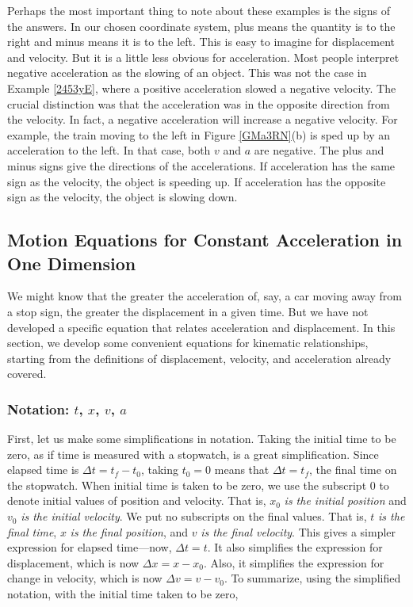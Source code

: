 \documentclass[../../main-ap-physics.tex]{subfiles}
\begin{document}
Perhaps the most important thing to note about these examples is the signs of the answers. In our chosen coordinate system, plus means the quantity is to the right and minus means it is to the left. This is easy to imagine for displacement and velocity. But it is a little less obvious for acceleration. Most people interpret negative acceleration as the slowing of an object. This was not the case in Example \ref{2453yE}, where a positive acceleration slowed a negative velocity. The crucial distinction was that the acceleration was in the opposite direction from the velocity. In fact, a negative acceleration will increase a negative velocity. For example, the train moving to the left in Figure \ref{GMa3RN}(b) is sped up by an acceleration to the left. In that case, both $v$ and $a$ are negative. The plus and minus signs give the directions of the accelerations. If acceleration has the same sign as the velocity, the object is speeding up. If acceleration has the opposite sign as the velocity, the object is slowing down.

\subsection{Motion Equations for Constant Acceleration in One Dimension} \label{WbwyTy}

We might know that the greater the acceleration of, say, a car moving away from a stop sign, the greater the displacement in a given time. But we have not developed a specific equation that relates acceleration and displacement. In this section, we develop some convenient equations for kinematic relationships, starting from the definitions of displacement, velocity, and acceleration already covered.

\subsubsection*{Notation: $t$, $x$, $v$, $a$}

First, let us make some simplifications in notation. Taking the initial time to be zero, as if time is measured with a stopwatch, is a great simplification. Since elapsed time is $\Delta t = t_f - t_0$, taking $t_0 = 0$ means that $\Delta t = t_f$, the final time on the stopwatch. When initial time is taken to be zero, we use the subscript 0 to denote initial values of position and velocity. That is, $x_0$ \textit{is the initial position} and $v_0$ \textit{is the initial velocity}. We put no subscripts on the final values. That is, $t$ \textit{is the final time}, $x$ \textit{is the final position}, and $v$ \textit{is the final velocity}. This gives a simpler expression for elapsed time---now, $\Delta t = t$. It also simplifies the expression for displacement, which is now $\Delta x = x - x_0$. Also, it simplifies the expression for change in velocity, which is now $\Delta v = v - v_0$. To summarize, using the simplified notation, with the initial time taken to be zero,
\end{document}
